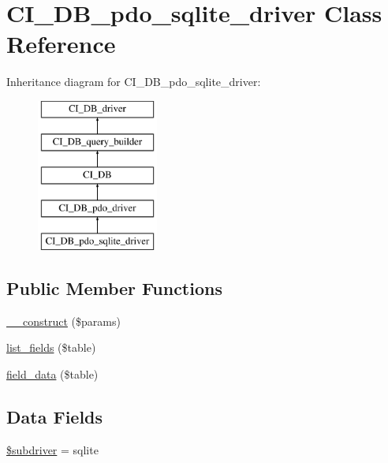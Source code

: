 \hypertarget{class_c_i___d_b__pdo__sqlite__driver}{}\section{C\+I\+\_\+\+D\+B\+\_\+pdo\+\_\+sqlite\+\_\+driver Class Reference}
\label{class_c_i___d_b__pdo__sqlite__driver}
Inheritance diagram for C\+I\+\_\+\+D\+B\+\_\+pdo\+\_\+sqlite\+\_\+driver\+:\begin{figure}[H]
\begin{center}
\leavevmode
\includegraphics[height=5.000000cm]{class_c_i___d_b__pdo__sqlite__driver}
\end{center}
\end{figure}
\subsection*{Public Member Functions}
\begin{DoxyCompactItemize}
\item 
\hyperlink{class_c_i___d_b__pdo__sqlite__driver_a9162320adff1a1a4afd7f2372f753a3e}{\+\_\+\+\_\+construct} (\$params)
\item 
\hyperlink{class_c_i___d_b__pdo__sqlite__driver_aef08cd376b16b24608100ca0e3f2f85b}{list\+\_\+fields} (\$table)
\item 
\hyperlink{class_c_i___d_b__pdo__sqlite__driver_a90355121e1ed009e0efdbd544ab56efa}{field\+\_\+data} (\$table)
\end{DoxyCompactItemize}
\subsection*{Data Fields}
\begin{DoxyCompactItemize}
\item 
\hyperlink{class_c_i___d_b__pdo__sqlite__driver_a1322ca756348b11d080cb7a4f590de15}{\$subdriver} = \textquotesingle{}sqlite\textquotesingle{}
\end{DoxyCompactItemize}
